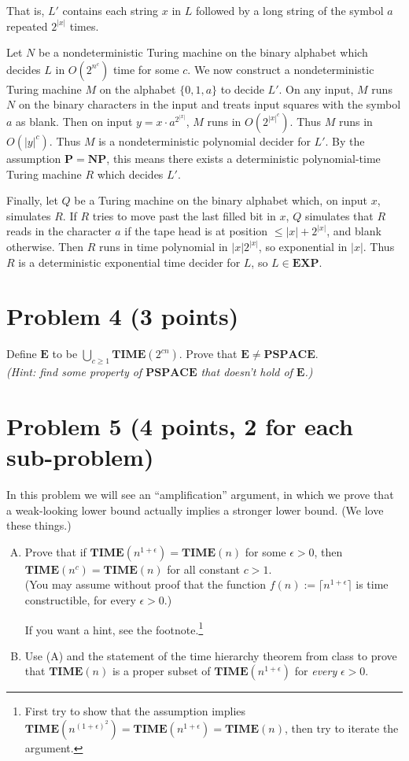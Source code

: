 \documentclass{article}
\renewcommand{\P}{\mathbf{P}}
\newcommand{\NP}{\mathbf{NP}}
\newcommand{\EXP}{\mathbf{EXP}}
\newcommand{\PSPACE}{\mathbf{PSPACE}}
\newcommand{\TIME}{\mathbf{TIME}}
\begin{document}
	That is, $L'$ contains each string $x$ in $L$ followed by a long string of the symbol $a$ repeated $2^{|x|}$ times.
	
	Let $N$ be a nondeterministic Turing machine on the binary alphabet which decides $L$ in $O(2^{n^c})$ time for some $c$.
	We now construct a nondeterministic Turing machine $M$ on the alphabet $\{0, 1, a\}$ to decide $L'$.
	On any input, $M$ runs $N$ on the binary characters in the input and treats input squares with the symbol $a$ as blank.
	Then on input $y = x \cdot a^{2^{|x|}}$, $M$ runs in $O(2^{|x|^c})$.  Thus $M$ runs 
	in $O(|y|^c)$.
	Thus $M$ is a nondeterministic polynomial decider for $L'$.
	By the assumption $\P = \NP$, this means there exists a deterministic polynomial-time Turing machine $R$ which decides $L'$.

	Finally, let $Q$ be a Turing machine on the binary alphabet which, on input $x$, simulates $R$.
	If $R$ tries to move past the last filled bit in $x$, $Q$ simulates that $R$ reads in the character $a$ if the tape head is at position $\leq |x| + 2^{|x|}$, and blank otherwise.
	Then $R$ runs in time polynomial in $|x| 2^{|x|}$, so exponential in $|x|$.  Thus $R$ is a deterministic exponential time decider for $L$, so $L \in \EXP$.


    \section*{Problem 4 (3 points)}
    Define $\mathbf{E}$ to be $\bigcup_{c\ge 1} \TIME(2^{cn})$. Prove that $\mathbf{E} \neq \PSPACE$.\\
    \emph{(Hint: find some property of $\PSPACE$ that doesn't hold of $\mathbf{E}$.)}
    
	\section*{Problem 5 (4 points, 2 for each sub-problem)}
	
	In this problem we will see an ``amplification'' argument, in which we prove that a weak-looking lower bound actually implies a stronger lower bound. (We love these things.)
	
	\begin{enumerate}[(A)]
		\item Prove that if $\TIME(n^{1+\epsilon})=\TIME(n)$ for some $\epsilon>0$, then $\TIME(n^c) = \TIME(n)$ for all constant $c >1$.\\ 
		(You may assume without proof that the function $f(n) := \lceil n^{1+\epsilon} \rceil$ is time constructible, for every $\epsilon > 0$.)
		
		If you want a hint, see the footnote.\footnote{\tiny First try to show that the assumption implies $\TIME(n^{(1+\epsilon)^2})=\TIME(n^{1+\epsilon}) = \TIME(n)$, then try to iterate the argument.}
		
		\item  Use (A) and the statement of the time hierarchy theorem from class to prove that $\TIME(n)$ is a proper subset of $\TIME(n^{1+\epsilon})$ for \emph{every} $\epsilon > 0$.
	\end{enumerate}
	
\end{document}
